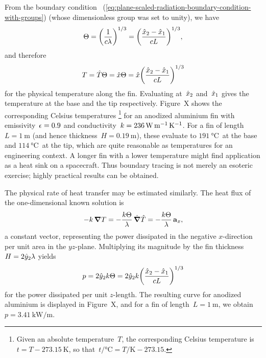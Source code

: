 From the boundary condition~%
  (\ref{eq:plane-scaled-radiation-boundary-condition-with-groups})
(whose dimensionless group was set to unity),
we have
\begin{equation}
  \Theta
    = \roundbr*{\frac{1}{c \lambda}}^{1/3}
    = \roundbr*{\frac{\scaled{x}_2 - \scaled{x}_1}{c L}}^{1/3},
  \label{eq:plane-fin-length-scale}
\end{equation}
and therefore
\begin{equation}
  T = \scaled{T} \Theta
    = \scaled{x} \Theta
    = \scaled{x} \roundbr*{\frac{\scaled{x}_2 - \scaled{x}_1}{c L}}^{1/3}
  \label{eq:plane-fin-temperature}
\end{equation}
for the physical temperature along the fin.
Evaluating at~$\hat{x}_2$ and~$\hat{x}_1$
gives the temperature at the base and the tip respectively.
Figure~X shows %
the corresponding Celsius temperatures%
\footnote{
  Given an absolute temperature~$T$,
  the corresponding Celsius temperature is~$t = T - \SI{273.15}{\kelvin}$,
  so that~$t / \si{\degreeCelsius} = T / \si{\kelvin} - 273.15$.
}
for an anodized aluminium fin
with emissivity~$\epsilon = 0.9$
and conductivity~$k = \SI{236}{\watt \per\metre \per\kelvin}$.
For a fin of length~$L = \SI{1}{\metre}$
(and hence thickness~$H = \SI{0.19}{\metre}$),
these evaluate to $\SI{191}{\degreeCelsius}$~at the base
and $\SI{114}{\degreeCelsius}$~at the tip,
which are quite reasonable as temperatures for an engineering context.
A longer fin with a lower temperature might find application
as a heat sink on a spacecraft.
Thus boundary tracing is not merely an esoteric exercise;
highly practical results can be obtained.

The physical rate of heat transfer may be estimated similarly.
The heat flux of the one-dimensional known solution is
\begin{equation}
  {-k} \mathop{}\!\boldsymbol{\mathbf{\nabla}} T
    = -\frac{k \Theta}{\lambda} \mathop{}\!\hat{\mathop{}\!\boldsymbol{\mathbf{\nabla}}}\hat{T}
    = -\frac{k \Theta}{\lambda} \mathop{}\!\boldsymbol{\mathbf{a}}_{x},
  \label{eq:plane-heat-flux}
\end{equation}
a constant vector,
representing the power dissipated in the negative $x$-direction
per unit area in the $yz$-plane.
Multiplying its magnitude by the fin thickness~$H = 2 \hat{y}_2 \lambda$
yields
\begin{equation}
  p = 2 \scaled{y}_2 \conduc \Theta
    =
      2 \scaled{y}_2 \conduc
      \roundbr*{\frac{\scaled{x}_2 - \scaled{x}_1}{c L}}^{1/3}
  \label{eq:plane-fin-power-per-length}
\end{equation}
for the power dissipated per unit $z$-length.
The resulting curve for anodized aluminium
is displayed in Figure~X\@, %
and for a fin of length~$L = \SI{1}{\metre}$,
we obtain~$p = \SI{3.41}{\kilo\watt \per\metre}$.

